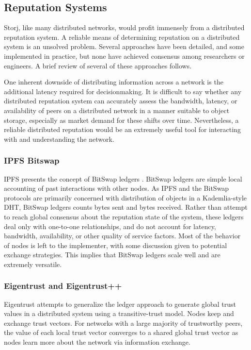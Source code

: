\documentclass[a4paper,10pt]{article}
\begin{document}
\subsection{Reputation Systems}
Storj, like many distributed networks, would profit immensely from a distributed reputation system. A reliable means of determining reputation on a distributed system is an unsolved problem. Several approaches have been detailed, and some implemented in practice, but none have achieved consensus among researchers or engineers. A brief review of several of these approaches follows.

One inherent downside of distributing information across a network is the additional latency required for decisionmaking. It is difficult to say whether any distributed reputation system can accurately assess the bandwidth, latency, or availability of peers on a distributed network in a manner suitable to object storage, especially as market demand for these shifts over time. Nevertheless, a reliable distributed reputation would be an extremely useful tool for interacting with and understanding the network.

\subsubsection{IPFS Bitswap}
IPFS presents the concept of BitSwap ledgers \cite{18}. BitSwap ledgers are simple local accounting of past interactions with other nodes. As IPFS and the BitSwap protocols are primarily concerned with distribution of objects in a Kademlia-style DHT, BitSwap ledgers counts bytes sent and bytes received. Rather than attempt to reach global consensus about the reputation state of the system, these ledgers deal only with one-to-one relationships, and do not account for latency, bandwidth, availability, or other quality of service factors. Most of the behavior of nodes is left to the implementer, with some discussion given to potential exchange strategies. This implies that BitSwap ledgers scale well and are extremely versatile.

\subsubsection{Eigentrust and Eigentrust++}
Eigentrust \cite{19} attempts to generalize the ledger approach to generate global trust values in a distributed system using a transitive-trust model. Nodes keep and exchange trust vectors. For networks with a large majority of trustworthy peers, the value of each local trust vector converges to a shared global trust vector as nodes learn more about the network via information exchange.
\end{document}
